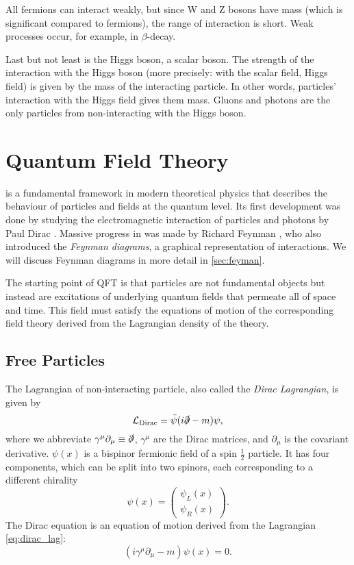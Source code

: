 All fermions can interact weakly, but since W and Z bosons have mass (which is significant compared to fermions), the range of interaction is short.
Weak processes occur, for example, in $\beta$-decay.

Last but not least is the Higgs boson, a scalar boson.
The strength of the interaction with the Higgs boson (more precisely: with the scalar field, Higgs field) is given by the mass of the interacting particle.
In other words, particles' interaction with the Higgs field gives them mass.
Gluons and photons are the only particles from \SM non-interacting with the Higgs boson.



\section{Quantum Field Theory}
\label{sec:qft}
\QFT is a fundamental framework in modern theoretical physics that describes the behaviour of particles and fields at the quantum level.
Its first development was done by studying the electromagnetic interaction of particles and photons by Paul Dirac \cite{dirac}.
Massive progress in \QED was made by Richard Feynman \cite{feynman}, who also introduced the \emph{Feynman diagrams}, a graphical representation of interactions.
We will discuss Feynman diagrams in more detail in \cref{sec:feyman}.

The starting point of QFT is that particles are not fundamental objects but instead are excitations of underlying quantum fields that permeate all of space and time. 
This field must satisfy the equations of motion of the corresponding field theory derived from the Lagrangian density of the theory.

\subsection{Free Particles}
\label{sec:free_particles}
The Lagrangian of non-interacting \spinhalf particle, also called the \emph{Dirac Lagrangian}, is given by
\begin{equation}
    \label{eq:dirac_lag}
    \mathcal{L}_{\text{Dirac}} = \bar{\psi}(i\slashed{\partial} - m) \psi,
\end{equation}
where we abbreviate $\gamma^\mu \partial_\mu \equiv \slashed{\partial}$, $\gamma^\mu$ are the Dirac matrices, and $\partial_\mu$ is the covariant derivative.
$\psi(x)$ is a bispinor fermionic field of a spin $\frac{1}{2}$ particle. 
It has four components, which can be split into two spinors, each corresponding to a different chirality
\begin{equation}
    \psi(x) = \left( \begin{array}{c} \psi_L(x) \\ \psi_R(x) \end{array} \right).
\end{equation}
The Dirac equation is an equation of motion derived from the Lagrangian \cref{eq:dirac_lag}:
\begin{equation}
    \label{eq:dirac_eq}
    \left( i \gamma^\mu \partial_\mu - m \right) \psi(x) = 0.
\end{equation}

